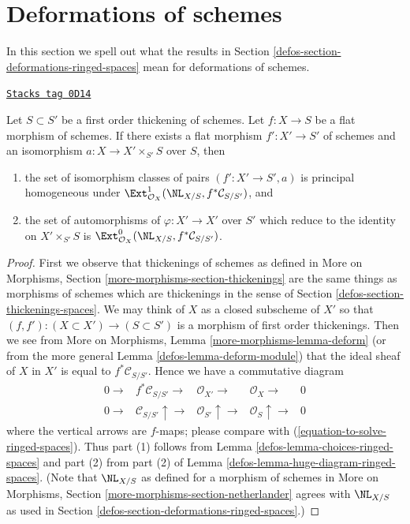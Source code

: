 \section{Deformations of schemes}
\label{defos-section-deformations-schemes}
In this section we spell out what the results in
Section \ref{defos-section-deformations-ringed-spaces}
mean for deformations of schemes.

\begin{lemma}[Deform]
\label{defos-lemma-deform}
\href{https://stacks.math.columbia.edu/tag/0D14}{\texttt{Stacks tag 0D14}}

Let $S \subset S'$ be a first order thickening of schemes.
Let $f : X \to S$ be a flat morphism of schemes.
If there exists a flat morphism $f' : X' \to S'$ of schemes
and an isomorphism $a : X \to X' \times_{S'} S$ over $S$, then
\begin{enumerate}
\item the set of isomorphism classes of pairs $(f' : X' \to S', a)$ is
principal homogeneous under
$\Ext^1_{\mathcal{O}_X}(\NL_{X/S}, f^*\mathcal{C}_{S/S'})$, and
\item the set of automorphisms of $\varphi : X' \to X'$
over $S'$ which reduce to the identity on $X' \times_{S'} S$
is $\Ext^0_{\mathcal{O}_X}(\NL_{X/S}, f^*\mathcal{C}_{S/S'})$.
\end{enumerate}
\end{lemma}

\begin{proof}

First we observe that thickenings of schemes as defined in
More on Morphisms, Section \ref{more-morphisms-section-thickenings}
are the same things as morphisms of schemes which
are thickenings in the sense of
Section \ref{defos-section-thickenings-spaces}.
We may think of $X$ as a closed subscheme of $X'$
so that $(f, f') : (X \subset X') \to (S \subset S')$
is a morphism of first order thickenings. Then we see
from More on Morphisms, Lemma \ref{more-morphisms-lemma-deform}
(or from the more general Lemma \ref{defos-lemma-deform-module})
that the ideal sheaf of $X$ in $X'$ is equal to $f^*\mathcal{C}_{S/S'}$.
Hence we have a commutative diagram
$$
\begin{array}{ccccc}0 \longrightarrow & f^*\mathcal{C}_{S/S'} \longrightarrow & \mathcal{O}_{X'} \longrightarrow & \mathcal{O}_X \longrightarrow & 0 \\ 0 \longrightarrow & \mathcal{C}_{S/S'} \uparrow\longrightarrow & \mathcal{O}_{S'} \uparrow\longrightarrow & \mathcal{O}_S \uparrow\longrightarrow & 0\end{array}
$$
where the vertical arrows are $f$-maps; please compare with
(\ref{equation-to-solve-ringed-spaces}).
Thus part (1) follows from
Lemma \ref{defos-lemma-choices-ringed-spaces}
and part (2) from part (2) of
Lemma \ref{defos-lemma-huge-diagram-ringed-spaces}.
(Note that $\NL_{X/S}$ as defined for a morphism of schemes in
More on Morphisms, Section \ref{more-morphisms-section-netherlander}
agrees with $\NL_{X/S}$ as used in
Section \ref{defos-section-deformations-ringed-spaces}.)
\end{proof}


